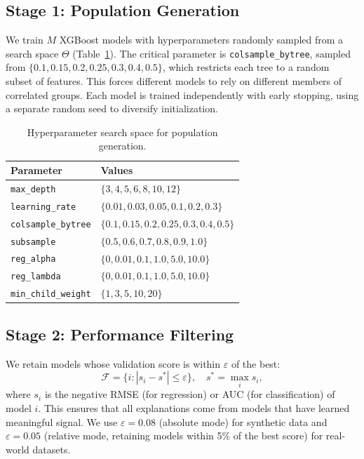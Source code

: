 \documentclass[11pt]{article}
\begin{document}
\subsection{Stage 1: Population Generation}

We train $M$ XGBoost \citep{chen2016xgboost} models with hyperparameters randomly sampled from a
search space $\Theta$ (Table~\ref{tab:search_space}). The critical
parameter is \texttt{colsample\_bytree}, sampled from
$\{0.1, 0.15, 0.2, 0.25, 0.3, 0.4, 0.5\}$, which restricts each tree
to a random subset of features. This forces different models to rely on
different members of correlated groups. Each model is trained independently
with early stopping, using a separate random seed to diversify initialization.

\begin{table}[htbp]
\centering
\caption{Hyperparameter search space for population generation.}
\label{tab:search_space}
\begin{tabular}{ll}
\toprule
\textbf{Parameter} & \textbf{Values} \\
\midrule
\texttt{max\_depth}         & $\{3, 4, 5, 6, 8, 10, 12\}$ \\
\texttt{learning\_rate}     & $\{0.01, 0.03, 0.05, 0.1, 0.2, 0.3\}$ \\
\texttt{colsample\_bytree}  & $\{0.1, 0.15, 0.2, 0.25, 0.3, 0.4, 0.5\}$ \\
\texttt{subsample}          & $\{0.5, 0.6, 0.7, 0.8, 0.9, 1.0\}$ \\
\texttt{reg\_alpha}         & $\{0, 0.01, 0.1, 1.0, 5.0, 10.0\}$ \\
\texttt{reg\_lambda}        & $\{0, 0.01, 0.1, 1.0, 5.0, 10.0\}$ \\
\texttt{min\_child\_weight} & $\{1, 3, 5, 10, 20\}$ \\
\bottomrule
\end{tabular}
\end{table}

\subsection{Stage 2: Performance Filtering}

We retain models whose validation score is within $\varepsilon$ of the
best:
\begin{equation}
  \mathcal{F} = \{i : |s_i - s^*| \leq \varepsilon\},
  \quad s^* = \max_i s_i,
  \label{eq:filter}
\end{equation}
where $s_i$ is the negative RMSE (for regression) or AUC (for
classification) of model $i$. This ensures that all explanations come from
models that have learned meaningful signal. We use $\varepsilon = 0.08$
(absolute mode) for synthetic data and $\varepsilon = 0.05$ (relative
mode, retaining models within 5\% of the best score) for real-world
datasets.
\end{document}
